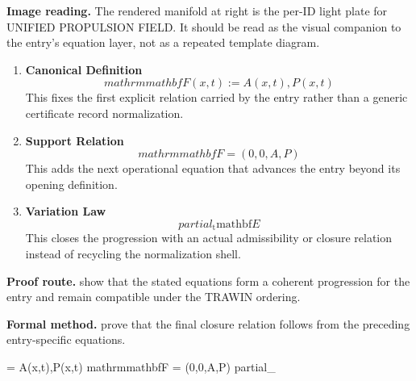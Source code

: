 \begin{samepage}
\noindent\begin{minipage}[t]{0.45\linewidth}
\vspace{0pt}
\raggedright
\scriptsize\textbf{Image reading.} The rendered manifold at right is the per-ID light plate for UNIFIED PROPULSION FIELD. It should be read as the visual companion to the entry's equation layer, not as a repeated template diagram.\par
\end{minipage}\hfill
\begin{minipage}[t]{0.53\linewidth}
\vspace*{-0.10in}
\raggedright
{}
\end{minipage}
\end{samepage}

\clearpage


\begin{enumerate}[leftmargin=1.6em,itemsep=9pt,topsep=6pt]
\item \textbf{Canonical Definition}
\[
mathrm{mathbf}{F}(x,t) := A(x,t),P(x,t)
\]
This fixes the first explicit relation carried by the entry rather than a generic certificate record normalization.

\item \textbf{Support Relation}
\[
mathrm{mathbf}{F} = (0,0,A,P)
\]
This adds the next operational equation that advances the entry beyond its opening definition.

\item \textbf{Variation Law}
\[
partial_{\mathrm{t}} \mathrm{mathbf}{E}
\]
This closes the progression with an actual admissibility or closure relation instead of recycling the normalization shell.
\end{enumerate}

\textbf{Proof route.} show that the stated equations form a coherent progression for the entry and remain compatible under the TRAWIN ordering.

\textbf{Formal method.} prove that the final closure relation follows from the preceding entry-specific equations.

\medskip
{}

\begin{tzpsnapshot}
\end{tzpsnapshot}

\tzpequationlinks
  {= A(x,t),P(x,t)}
  {mathrm{mathbf}{F} = (0,0,A,P)}
  {partial_{} }
